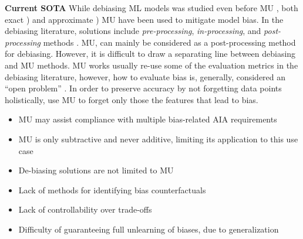 \textbf{Current SOTA}
While debiasing ML models was studied even before MU \citep{zemel2013learningfairreps}, both exact \citep{DBLP:journals/corr/abs-2405-14020}) and approximate \citep{chen2023fastmodeldebiasmachine, DBLP:conf/aistats/OesterlingMCL24, DBLP:journals/corr/abs-2405-14020}) MU have been used to mitigate model bias.
In the debiasing literature, solutions include \textit{pre-processing}, \textit{in-processing}, and \textit{post-processing} methods \citep{mehrabi2021fairnesssurvey}. MU, can mainly be considered as a post-processing method for debiasing. However, it is difficult to draw a separating line between debiasing and MU methods. MU works usually re-use some of the evaluation metrics in the debiasing literature, however, how to evaluate bias is, generally, considered an ``open problem'' \citep{reuel2024openproblemstechnicalai}. In order to preserve accuracy by not forgetting data points holistically, \citep{xu2024dontforgetmuchmachine} use MU to forget only those the features that lead to bias.

\begin{tcolorbox}[colback=green!10,colframe=black!50,title=Key Points]
\begin{itemize}[leftmargin=0pt]
    \item MU may assist compliance with multiple bias-related AIA requirements
    \item MU is only subtractive and never additive, limiting its application to this use case
        \item De-biasing solutions are not limited to MU
\end{itemize}
\end{tcolorbox}


\begin{tcolorbox}[colback=red!10,colframe=black!50,title=Open Problems]
\begin{itemize}[leftmargin=0pt]
    \item Lack of methods for identifying bias counterfactuals 
    \item  Lack of controllability over trade-offs
    \item Difficulty of guaranteeing full unlearning of biases, due to generalization
\end{itemize}
\end{tcolorbox}


